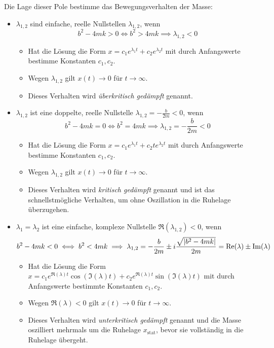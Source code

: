 				Die Lage dieser Pole bestimme das Bewegungsverhalten der Masse:
				\begin{itemize}
					\item \( \lambda _ { 1, 2 } \) sind einfache, reelle Nullstellen \( \lambda _ { 1, 2 } \), wenn
						\begin{equation*}
							b ^ 2 - 4mk > 0 \iff b ^ 2 > 4mk \implies \lambda _ { 1, 2 } < 0
						\end{equation*}
						\begin{itemize}
							\item Hat die Lösung die Form \( x = c_1 e^{\lambda_1 t} + c_2 e^{\lambda_2 t} \) mit durch Anfangswerte bestimme Konstanten \( c _ 1, c _ 2 \).
							\item Wegen \( \lambda _ { 1, 2 } \) gilt \( x(t) \rightarrow 0 \) für \( t \rightarrow \infty \).
							\item Dieses Verhalten wird \textit{überkritisch gedämpft} genannt.
						\end{itemize}
					\item \( \lambda _ { 1, 2 } \) ist eine doppelte, reelle Nullstelle \( \lambda_{1,2} = -\frac{b}{2m} < 0 \), wenn
						\begin{equation*}
							b^2 - 4mk = 0 \iff b^2 = 4mk \implies \lambda _ { 1, 2 } = -\frac{b}{2m} < 0
						\end{equation*}
						\begin{itemize}
							\item Hat die Lösung die Form \( x = c_1 e^{\lambda_1 t} + c_2 t e^{\lambda_2 t} \) mit durch Anfangswerte bestimme Konstanten \( c _ 1, c _ 2 \).
							\item Wegen \( \lambda _ { 1, 2 } \) gilt \( x(t) \rightarrow 0 \) für \( t \rightarrow \infty \).
							\item Dieses Verhalten wird \textit{kritisch gedämpft} genannt und ist das schnellstmögliche Verhalten, um ohne Oszillation in die Ruhelage überzugehen.
						\end{itemize}
					\item \( \lambda _ 1 = \lambda _ 2 \) ist eine einfache, komplexe Nullstelle \( \Re(\lambda _ {1,2}) < 0 \), wenn
						\begin{equation*}
							b ^ 2 - 4mk < 0 \iff b ^ 2 < 4mk \implies \lambda _ { 1, 2 } = -\frac{b}{2m} \pm i \frac{\sqrt{\abs{b^2 - 4mk}}}{2m} = \Re(\lambda) \pm \Im(\lambda)
						\end{equation*}
						\begin{itemize}
							\item Hat die Lösung die Form \( x = c_1 e ^ { \Re(\lambda) t } \cos(\Im(\lambda) t) + c_2 e ^ { \Re(\lambda) t } \sin(\Im(\lambda) t) \) mit durch Anfangswerte bestimmte Konstanten \( c _ 1, c _ 2 \).
							\item Wegen \( \Re(\lambda) < 0 \) gilt \( x(t) \rightarrow 0 \) für \( t \rightarrow \infty \).
							\item Dieses Verhalten wird \textit{unterkritisch gedämpft} genannt und die Masse oszilliert mehrmals um die Ruhelage \( x _ \text{stat} \), bevor sie vollständig in die Ruhelage übergeht.
						\end{itemize}
				\end{itemize}
			
